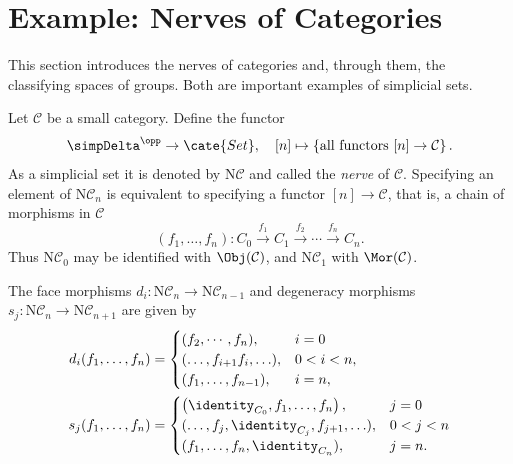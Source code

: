 
\section{Example: Nerves of Categories}\label{sec:nerves}
\hypertarget{o014.aljabr2.chapter8.nerves-of-categories}{ }
This section introduces the nerves of categories and, through them, the
classifying spaces of groups. Both are important examples of simplicial sets.

\begin{example}\label{eg:nerve-cat}
	Let $\mathcal{C}$ be a small category. Define the functor
	\[ \simpDelta^{\opp} \to \cate{Set}, \quad [n] \mapsto \left\{ \text{all functors } [n] \to \mathcal{C} \right\}. \]
	As a simplicial set it is denoted by $\mathrm{N}\mathcal{C}$ and called
	the \emph{nerve} of $\mathcal{C}$. Specifying an element of
	$\mathrm{N}\mathcal{C}_n$ is equivalent to specifying a functor
	$[n]\to\mathcal{C}$, that is, a chain of morphisms in $\mathcal{C}$
	\[ (f_1, \ldots, f_n): C_0 \xrightarrow{f_1} C_1 \xrightarrow{f_2} \cdots \xrightarrow{f_n} C_n. \]
	Thus $\mathrm{N}\mathcal{C}_0$ may be identified with
	$\Obj(\mathcal{C})$, and $\mathrm{N}\mathcal{C}_1$ with
	$\Mor(\mathcal{C})$.

	The face morphisms $d_i:\mathrm{N}\mathcal{C}_n\to
	\mathrm{N}\mathcal{C}_{n-1}$ and degeneracy morphisms
	$s_j:\mathrm{N}\mathcal{C}_n\to\mathrm{N}\mathcal{C}_{n+1}$ are given
	by
	\begin{align*}
		d_i(f_1, \ldots, f_n) & = \begin{cases}
			(f_2, \cdots, f_n), & i = 0 \\
			(\ldots, f_{i+1} f_i, \ldots), & 0 < i < n, \\
			(f_1, \ldots, f_{n-1}), & i = n,
		\end{cases} \\
		s_j(f_1, \ldots, f_n) & = \begin{cases}
			\left( \identity_{C_0}, f_1, \ldots, f_n \right), & j = 0 \\
			(\ldots, f_j, \identity_{C_j}, f_{j+1}, \ldots ), & 0 < j < n \\
			(f_1, \ldots, f_n, \identity_{C_n}), & j = n.
		\end{cases}
	\end{align*}
\end{example}

